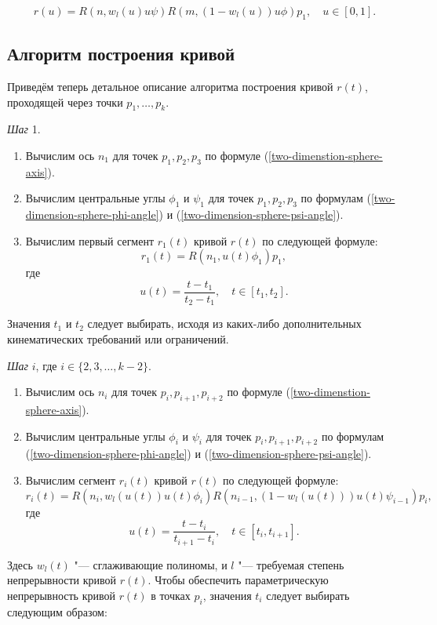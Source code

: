 $$
r(u)=R(n,w_l(u)u\psi)R(m,(1-w_l(u))u\phi)p_1, \quad u \in [0,1].
$$

\subsection*{Алгоритм построения кривой}

Приведём теперь детальное описание алгоритма построения кривой $r(t)$, проходящей через точки $p_1,\dots,p_k$.

\bigskip
\textit{Шаг} 1.

\begin{enumerate}
\item Вычислим ось $n_1$ для точек $p_1, p_2, p_3$ по формуле (\ref{two-dimenstion-sphere-axis}).
\item Вычислим центральные углы $\phi_1$ и $\psi_1$ для точек $p_1, p_2, p_3$ по формулам
(\ref{two-dimension-sphere-phi-angle}) и (\ref{two-dimension-sphere-psi-angle}).
\item Вычислим первый сегмент $r_1(t)$ кривой $r(t)$ по следующей формуле:
$$
r_1(t)=R(n_1,u(t)\phi_1)p_1,
$$
\noindent где
$$
u(t)=\frac{t-t_1}{t_2-t_1}, \quad t \in [t_1,t_2].
$$
\end{enumerate}

Значения $t_1$ и $t_2$ следует выбирать, исходя из каких-либо дополнительных кинематических требований или ограничений.

\bigskip
\textit{Шаг} $i$, где $i \in \{2,3,\dots,k-2\}$.

\begin{enumerate}
\item Вычислим ось $n_i$ для точек $p_i, p_{i+1}, p_{i+2}$ по формуле (\ref{two-dimenstion-sphere-axis}).
\item Вычислим центральные углы $\phi_i$ и $\psi_i$ для точек $p_i, p_{i+1}, p_{i+2}$ по формулам
(\ref{two-dimension-sphere-phi-angle}) и (\ref{two-dimension-sphere-psi-angle}).
\item Вычислим сегмент $r_i(t)$ кривой $r(t)$ по следующей формуле:
$$
r_i(t)=R(n_i,w_l(u(t))u(t)\phi_i)R(n_{i-1},(1-w_l(u(t)))u(t)\psi_{i-1})p_i,
$$
\noindent где
$$
u(t)=\frac{t-t_i}{t_{i+1}-t_i}, \quad t \in [t_i,t_{i+1}].
$$
\end{enumerate}

Здесь $w_l(t)$ "--- сглаживающие полиномы, и $l$ "--- требуемая степень непрерывности кривой $r(t)$. Чтобы обеспечить
параметрическую непрерывность кривой $r(t)$ в точках $p_i$, значения $t_i$ следует выбирать следующим образом:

